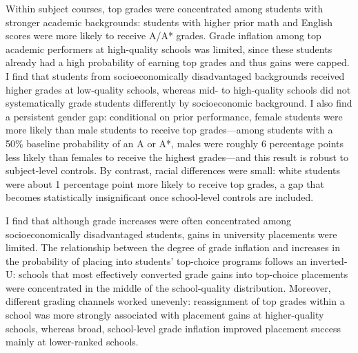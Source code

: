 Within subject courses, top grades were concentrated among students with stronger academic backgrounds: students with higher prior math and English scores were more likely to receive A/A* grades. Grade inflation among top academic performers at high-quality schools was limited, since these students already had a high probability of earning top grades and thus gains were capped. I find that students from socioeconomically disadvantaged backgrounds received higher grades at low-quality schools, whereas mid- to high-quality schools did not systematically grade students differently by socioeconomic background. I also find a persistent gender gap: conditional on prior performance, female students were more likely than male students to receive top grades—among students with a 50\% baseline probability of an A or A*, males were roughly 6 percentage points less likely than females to receive the highest grades—and this result is robust to subject-level controls. By contrast, racial differences were small: white students were about 1 percentage point more likely to receive top grades, a gap that becomes statistically insignificant once school-level controls are included.

I find that although grade increases were often concentrated among socioeconomically disadvantaged students, gains in university placements were limited. The relationship between the degree of grade inflation and increases in the probability of placing into students’ top-choice programs follows an inverted-U: schools that most effectively converted grade gains into top-choice placements were concentrated in the middle of the school-quality distribution. Moreover, different grading channels worked unevenly: reassignment of top grades within a school was more strongly associated with placement gains at higher-quality schools, whereas broad, school-level grade inflation improved placement success mainly at lower-ranked schools.

